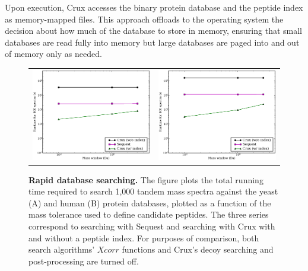 \documentclass[12pt]{article}
\begin{document}
Upon execution, Crux accesses the binary protein database and the
peptide index as memory-mapped files.  This approach offloads to the
operating system the decision about how much of the database to store
in memory, ensuring that small databases are read fully into memory
but large databases are paged into and out of memory only as needed.

\begin{figure}
  \centering
  \begin{tabular}{cc}
  \includegraphics[width=3in]{./Images/indexing-yeast.eps} & 
  \includegraphics[width=3in]{./Images/indexing-human.eps} \\
\end{tabular}
  \caption{{\bf Rapid database searching.}  The figure plots the total
  running time required to search 1,000 tandem mass spectra against
  the yeast (A) and human (B) protein databases, 
  plotted as a function of the mass
  tolerance used to define candidate peptides.  The three series
  correspond to searching with {\sc Sequest} and searching with Crux
  with and without a peptide index.  For purposes of comparison,
  both search algorithms' $Xcorr$ functions 
  and Crux's decoy searching and post-processing are turned off.
  \label{figure:indexing}}
\end{figure}
% 
%
% 
% 
% 
% 
\end{document}
